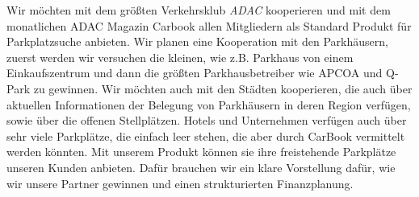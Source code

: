 \documentclass[12pt,ngerman, fleqn]{book} %
\begin{document}
Wir möchten mit dem größten Verkehrsklub \emph{ADAC} kooperieren und mit dem monatlichen ADAC Magazin Carbook allen Mitgliedern als Standard Produkt für Parkplatzsuche anbieten. Wir planen eine Kooperation mit den Parkhäusern, zuerst werden wir versuchen die kleinen, wie z.B. Parkhaus von einem Einkaufszentrum und dann die größten Parkhausbetreiber wie APCOA und Q-Park \autocite{statista6} zu gewinnen. Wir möchten auch mit den Städten kooperieren, die auch über aktuellen Informationen der Belegung von Parkhäusern in deren Region verfügen, sowie über die offenen Stellplätzen. Hotels und Unternehmen verfügen auch über sehr viele Parkplätze, die einfach leer stehen, die aber durch CarBook vermittelt werden könnten. Mit unserem Produkt können sie ihre freistehende Parkplätze unseren Kunden anbieten.  Dafür brauchen wir ein klare Vorstellung dafür, wie wir unsere Partner gewinnen und einen strukturierten Finanzplanung.



\end{document}
